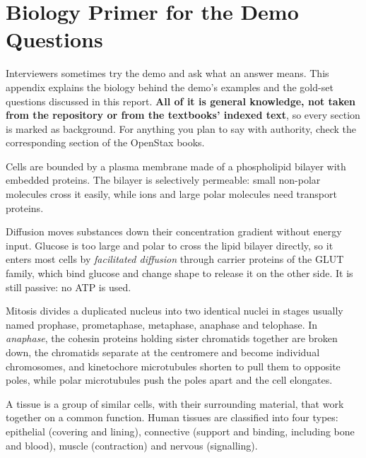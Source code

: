 \chapter{Biology Primer for the Demo Questions}
\label{app:biology}

Interviewers sometimes try the demo and ask what an answer means. This appendix explains the biology behind the demo's examples and the gold-set questions discussed in this report. \textbf{All of it is general knowledge, not taken from the repository or from the textbooks' indexed text}, so every section is marked as background. For anything you plan to say with authority, check the corresponding section of the OpenStax books.

\begin{background}
Cells are bounded by a plasma membrane made of a phospholipid bilayer with embedded proteins. The bilayer is selectively permeable: small non-polar molecules cross it easily, while ions and large polar molecules need transport proteins.
\end{background}

\begin{background}
Diffusion moves substances down their concentration gradient without energy input. Glucose is too large and polar to cross the lipid bilayer directly, so it enters most cells by \emph{facilitated diffusion} through carrier proteins of the GLUT family, which bind glucose and change shape to release it on the other side. It is still passive: no ATP is used.
\end{background}

\begin{background}
Mitosis divides a duplicated nucleus into two identical nuclei in stages usually named prophase, prometaphase, metaphase, anaphase and telophase. In \emph{anaphase}, the cohesin proteins holding sister chromatids together are broken down, the chromatids separate at the centromere and become individual chromosomes, and kinetochore microtubules shorten to pull them to opposite poles, while polar microtubules push the poles apart and the cell elongates.
\end{background}

\begin{background}[tissues]
A tissue is a group of similar cells, with their surrounding material, that work together on a common function. Human tissues are classified into four types: epithelial (covering and lining), connective (support and binding, including bone and blood), muscle (contraction) and nervous (signalling).
\end{background}

